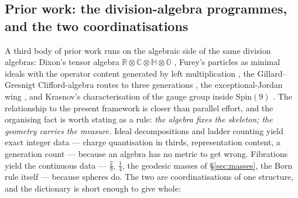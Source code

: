 \subsection{Prior work: the division-algebra programmes, and the two coordinatisations}
\label{sec:algebraic-dictionary}

A third body of prior work runs on the algebraic side of the same division algebras: Dixon's
tensor algebra $\mathbb{R} \otimes \mathbb{C} \otimes \mathbb{H} \otimes \mathbb{O}$
\autocite{dixon1994division}, Furey's particles as minimal ideals with the operator content
generated by left multiplication \autocite{furey2012unified,furey2018three}, the
Gillard--Gresnigt Clifford-algebra routes to three generations
\autocite{gillardgresnigt2019three}, the exceptional-Jordan wing
\autocite{duboisviolettetodorov2019exceptional}, and Krasnov's characterisation of the gauge
group inside $\mathrm{Spin}(9)$ \autocite{krasnov2021so9}. The relationship to the present
framework is closer than parallel effort, and the organising fact is worth stating as a rule:
\emph{the algebra fixes the skeleton; the geometry carries the measure.} Ideal decompositions
and ladder counting yield exact integer data --- charge quantisation in thirds, representation
content, a generation count --- because an algebra has no metric to get wrong. Fibrations yield
the continuous data --- $\tfrac29$, $\tfrac14$, the geodesic masses of \S\ref{sec:masses}, the
Born rule itself --- because spheres do. The two are coordinatisations of one structure, and the
dictionary is short enough to give whole:

